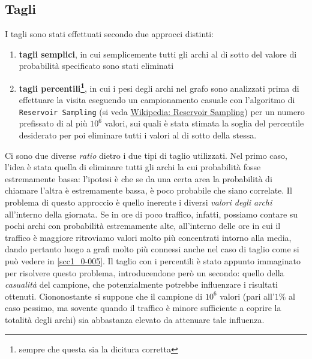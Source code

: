\documentclass[10pt,a4paper]{article}
\begin{document}
\subsection{Tagli}
\label{tagli}
I tagli sono stati effettuati secondo due approcci distinti:
\begin{enumerate}
\item \textbf{tagli semplici}, in cui semplicemente tutti gli archi al di sotto del valore di probabilità specificato sono stati eliminati
\item \textbf{tagli percentili\footnote{sempre che questa sia la dicitura corretta}}, in cui i pesi degli archi nel grafo sono analizzati prima di effettuare la visita eseguendo un campionamento casuale con l'algoritmo di \texttt{Reservoir Sampling} (si veda \href{http://en.wikipedia.org/wiki/Reservoir_sampling}{Wikipedia: Reservoir Sampling}) per un numero prefissato di al più $10^6$ valori, sui quali è stata stimata la soglia del percentile desiderato per poi eliminare tutti i valori al di sotto della stessa.
\end{enumerate}
Ci sono due diverse \emph{ratio} dietro i due tipi di taglio utilizzati. 
Nel primo caso, l'idea è stata quella di eliminare tutti gli archi la cui probabilità fosse estremamente bassa: l'ipotesi è che se da una certa area la probabilità di chiamare l'altra è estremamente bassa, è poco probabile che siano correlate.
Il problema di questo approccio è quello inerente i diversi \emph{valori degli archi} all'interno della giornata. Se in ore di poco traffico, infatti, possiamo contare su pochi archi con probabilità estremamente alte, all'interno delle ore in cui il traffico è maggiore ritroviamo valori molto più concentrati intorno alla media, dando pertanto luogo a grafi molto più connessi anche nel caso di taglio come si può vedere in \ref{scc1_0-005}.
Il taglio con i percentili è stato appunto immaginato per risolvere questo problema, introducendone però un secondo: quello della \emph{casualità} del campione, che potenzialmente potrebbe influenzare i risultati ottenuti. Ciononostante si suppone che il campione di $10^6$ valori (pari all'$1\%$ al caso pessimo, ma sovente quando il traffico è minore sufficiente a coprire la totalità degli archi) sia abbastanza elevato da attenuare tale influenza.

%
\end{document}
